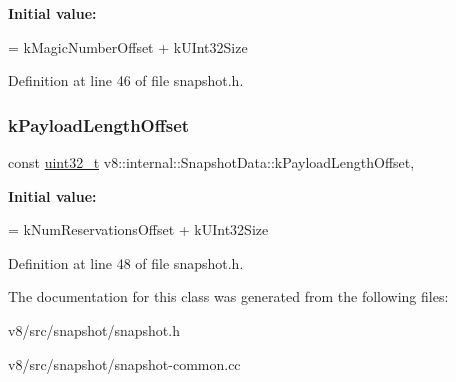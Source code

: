 {\bfseries Initial value\+:}
\begin{DoxyCode}
=
      kMagicNumberOffset + kUInt32Size
\end{DoxyCode}


Definition at line 46 of file snapshot.\+h.

\mbox{\label{classv8_1_1internal_1_1SnapshotData_a8cd2a841789d01c5ffd3f10cfeecb03a}} 
\subsubsection{\texorpdfstring{k\+Payload\+Length\+Offset}{kPayloadLengthOffset}}
{\footnotesize\ttfamily const \mbox{\hyperlink{classuint32__t}{uint32\+\_\+t}} v8\+::internal\+::\+Snapshot\+Data\+::k\+Payload\+Length\+Offset\hspace{0.3cm}{\ttfamily [static]}, {\ttfamily [protected]}}

{\bfseries Initial value\+:}
\begin{DoxyCode}
=
      kNumReservationsOffset + kUInt32Size
\end{DoxyCode}


Definition at line 48 of file snapshot.\+h.



The documentation for this class was generated from the following files\+:\begin{DoxyCompactItemize}
\item 
v8/src/snapshot/snapshot.\+h\item 
v8/src/snapshot/snapshot-\/common.\+cc\end{DoxyCompactItemize}
